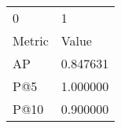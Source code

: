 \begin{tabular}{ll}
0 & 1 \\
Metric & Value \\
AP & 0.847631 \\
P@5 & 1.000000 \\
P@10 & 0.900000 \\
\end{tabular}
